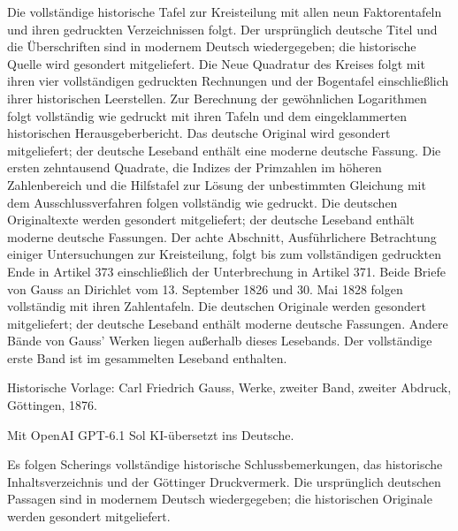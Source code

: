 \begin{titlepage}
\begin{minipage}{0.98\linewidth}\small
Die vollständige historische Tafel zur Kreisteilung mit allen neun Faktorentafeln und ihren gedruckten Verzeichnissen folgt. Der ursprünglich deutsche Titel und die Überschriften sind in modernem Deutsch wiedergegeben; die historische Quelle wird gesondert mitgeliefert. Die Neue Quadratur des Kreises folgt mit ihren vier vollständigen gedruckten Rechnungen und der Bogentafel einschließlich ihrer historischen Leerstellen. Zur Berechnung der gewöhnlichen Logarithmen folgt vollständig wie gedruckt mit ihren Tafeln und dem eingeklammerten historischen Herausgeberbericht. Das deutsche Original wird gesondert mitgeliefert; der deutsche Leseband enthält eine moderne deutsche Fassung. Die ersten zehntausend Quadrate, die Indizes der Primzahlen im höheren Zahlenbereich und die Hilfstafel zur Lösung der unbestimmten Gleichung mit dem Ausschlussverfahren folgen vollständig wie gedruckt. Die deutschen Originaltexte werden gesondert mitgeliefert; der deutsche Leseband enthält moderne deutsche Fassungen. Der achte Abschnitt, Ausführlichere Betrachtung einiger Untersuchungen zur Kreisteilung, folgt bis zum vollständigen gedruckten Ende in Artikel 373 einschließlich der Unterbrechung in Artikel 371. Beide Briefe von Gauss an Dirichlet vom 13. September 1826 und 30. Mai 1828 folgen vollständig mit ihren Zahlentafeln. Die deutschen Originale werden gesondert mitgeliefert; der deutsche Leseband enthält moderne deutsche Fassungen. Andere Bände von Gauss’ Werken liegen außerhalb dieses Lesebands. Der vollständige erste Band ist im gesammelten Leseband enthalten.

Historische Vorlage: Carl Friedrich Gauss, Werke, zweiter Band, zweiter Abdruck, Göttingen, 1876.

Mit OpenAI GPT-6.1 Sol KI-übersetzt ins Deutsche.

\par  Es folgen Scherings vollständige historische Schlussbemerkungen, das historische Inhaltsverzeichnis und der Göttinger Druckvermerk. Die ursprünglich deutschen Passagen sind in modernem Deutsch wiedergegeben; die historischen Originale werden gesondert mitgeliefert.
\end{minipage}\end{titlepage}
